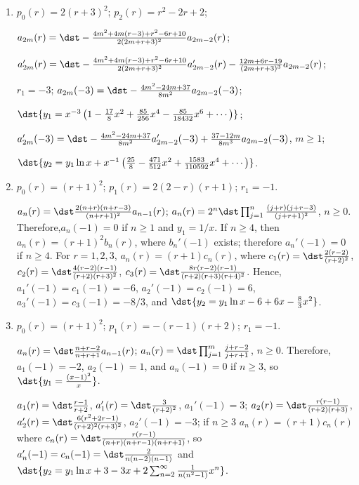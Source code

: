 \documentclass[openany]{book}
\newenvironment{sectionSolutions}{
 \begin{enumerate}[item-label={\thesection.\arabic{enumi}.}]
}{
 \end{enumerate}
}
\begin{document}
\begin{sectionSolutions}
$r_1=1$;
$a_{2m}(1)=\dst-\frac{1}{2m}a_{2m-2}(1)$;

$\dst{y_1=x\left(1-\frac{1}{2}x^2+\frac{1}{8}x^4-\frac{1}{48}x^6+\cdots\right)}$;

$a_{2m}'(1)=\dst
-\frac{1}{2m}a_{2m-2}'(1)+\frac{1}{4m^2}a_{2m-2}(1)$,
$m\ge1$;


$\dst{y_2=y_1 \ln x+x^3\left(\frac{1}{4}-\frac{3}{32}x^2+
\frac{11}{576}x^4+\cdots\right)}$.


\item
$p_0(r)=2(r+3)^2$;
$p_2(r)=r^2-2r+2$;

$a_{2m}(r)=\dst
-\frac{4m^2+4m(r-3)+r^2-6r+10}{2(2m+r+3)^2}a_{2m-2}(r)$;


$a_{2m}'(r)=\dst
-\frac{4m^2+4m(r-3)+r^2-6r+10}{2(2m+r+3)^2}a_{2m-2}'(r)
-\frac{12m+6r-19}{(2m+r+3)^3}a_{2m-2}(r)$;

$r_1=-3$;
$a_{2m}(-3)=\dst-\frac{4m^2-24m+37}{8m^2}a_{2m-2}(-3)$;

$\dst{y_1=x^{-3}\left(1-\frac{17}{8}x^2+\frac{85}{256}x^4-
\frac{85}{18432}x^6+\cdots\right)}$;


$a_{2m}'(-3)=\dst
-\frac{4m^2-24m+37}{8m^2}a_{2m-2}'(-3)+\frac{37-12m}{8m^3}a_{2m-2}(-3)$,
$m\ge1$;

$\dst{y_2=y_1\ln x
+x^{-1}\left(\frac{25}{8}-\frac{471}{512}x^2+\frac{1583}{110592}x^4
+\cdots\right)}$.


\item
$p_0(r)=(r+1)^2$;
$p_1(r)=2(2-r)(r+1)$;
$r_1=-1$.

$a_n(r)=\dst\frac{2(n+r)(n+r-3)}{(n+r+1)^2}
a_{n-1}(r)$;
 $a_n(r)=2^n\dst\prod_{j=1}^n\frac{(j+r)(j+r-3)}{(j+r+1)^2}$,
$n\ge0$. Therefore,$a_n(-1)=0$ if $n\ge1$ and $y_1=1/x$.
If $n\ge4$, then $a_n(r)=(r+1)^2b_n(r)$, where $b_n'(-1)$
exists; therefore $a_n'(-1)=0$ if $n\ge4$. For $r=1,2,3$,
$a_n(r)=(r+1)c_n(r)$, where
$c_1(r)=\dst\frac{2(r-2)}{(r+2)^2}$,
$c_2(r)=\dst\frac{4(r-2)(r-1)}{(r+2)(r+3)^2}$,
$c_3(r)=\dst
\frac{8r(r-2)(r-1)}{(r+2)(r+3)(r+4)^2}$. Hence,
$a_1'(-1)=c_1(-1)=-6$, $a_2'(-1)=c_2(-1)=6$, $a_3'(-1)=c_3(-1)=-8/3$,
and
 $\dst{y_2=y_1\ln x-6+6x-\frac{8}{3}x^2}$.


\item
$p_0(r)=(r+1)^2$;
$p_1(r)=-(r-1)(r+2)$;
$r_1=-1$.


$a_n(r)=\dst\frac{n+r-2}{ n+r+1}
a_{n-1}(r)$;
 $a_n(r)=\dst\prod_{j=1}^m\frac{j+r-2}{ j+r+1}$,
$n\ge0$. Therefore,$a_1(-1)=-2$, $a_2(-1)=1$, and $a_n(-1)=0$
if $n\ge3$, so
$\dst{y_1=\frac{(x-1)^2}{ x}}$.

$a_1(r)=\dst\frac{r-1}{ r+2}$, $a_1'(r)=\dst\frac{3}{(r+2)^2}$,
$a_1'(-1)=3$;
$a_2(r)=\dst
\frac{r(r-1)}{(r+2)(r+3)}$,
$a_2'(r)=\dst
\frac{6(r^2+2r-1)}{(r+2)^2(r+3)^2}$,
$a_2'(-1)=-3$;
if $n\ge3$
$a_n(r)=(r+1)c_n(r)$ where
$c_n(r)=\dst\frac{r(r-1)}{(n+r)(n+r-1)(n+r+1)}$, so $a_n'(-1)=c_n(-1)=
\dst\frac{2}{ n(n-2)(n-1)}$ and
 $\dst{y_2=y_1\ln x+3-3x+2\sum_{n=2}^\infty
\frac{1}{ n(n^2-1)}x^n}$.



\end{sectionSolutions}
\end{document}
